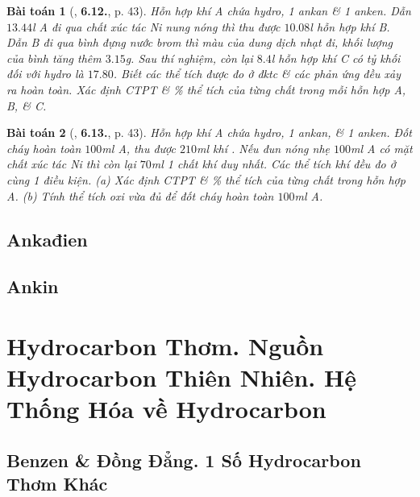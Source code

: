 \documentclass{article}
\numberwithin{equation}{section}
\newtheorem{baitoan}{Bài toán}[section]
\begin{document}
\begin{baitoan}[\cite{SBT_Hoa_Hoc_11_co_ban}, \textbf{6.12.}, p. 43]
	Hỗn hợp khí A chứa hydro, 1 ankan \& 1 anken. Dẫn $13.44$\emph{l} A đi qua chất xúc tác \emph{Ni} nung nóng thì thu được $10.08$\emph{l} hỗn hợp khí B. Dẫn B đi qua bình đựng nước brom thì màu của dung dịch nhạt đi, khối lượng của bình tăng thêm $3.15$\emph{g}. Sau thí nghiệm, còn lại $8.4$\emph{l} hỗn hợp khí C có tỷ khối đối với hydro là $17.80$. Biết các thể tích được đo ở đktc \& các phản ứng đều xảy ra hoàn toàn. Xác định CTPT \& \% thể tích của từng chất trong mỗi hỗn hợp A, B, \& C.
\end{baitoan}

\begin{baitoan}[\cite{SBT_Hoa_Hoc_11_co_ban}, \textbf{6.13.}, p. 43]
	Hỗn hợp khí A chứa hydro, 1 ankan, \& 1 anken. Đốt cháy hoàn toàn $100$\emph{ml} A, thu được $210$\emph{ml} khí \emph{}. Nếu đun nóng nhẹ $100$\emph{ml} A có mặt chất xúc tác \emph{Ni} thì còn lại $70$\emph{ml} 1 chất khí duy nhất. Các thể  tích khí đều đo ở cùng 1 điều kiện. (a) Xác định CTPT \& \% thể tích của từng chất trong hỗn hợp A. (b) Tính thể tích oxi vừa đủ để đốt cháy hoàn toàn $100$\emph{ml} A.
\end{baitoan}


\subsection{Ankađien}


\subsection{Ankin}


\section{Hydrocarbon Thơm. Nguồn Hydrocarbon Thiên Nhiên. Hệ Thống Hóa về Hydrocarbon}

\subsection{Benzen \& Đồng Đẳng. 1 Số Hydrocarbon Thơm Khác}
\end{document}
